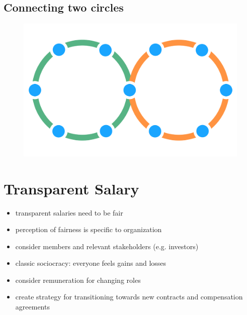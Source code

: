 \subsection{Connecting two circles}
\label{connectingtwocircles}

\begin{figure}[htbp]
\centering
\includegraphics[keepaspectratio,width=\textwidth,height=0.75\textheight]{img/structural-patterns/link.png}
\end{figure}

\section{Transparent Salary}
\label{transparentsalary}

\begin{itemize}
\item transparent salaries need to be fair

\item perception of fairness is specific to organization

\item consider members and relevant stakeholders (e.g. investors)

\item classic sociocracy: everyone feels gains and losses

\item consider remuneration for changing roles

\item create strategy for transitioning towards new contracts and compensation agreements

\end{itemize}

